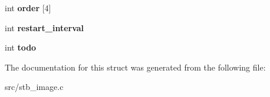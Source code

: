 \begin{DoxyCompactItemize}
\item 
\hypertarget{structjpeg_ac0f5240fc472e75239328f51a50f45b6}{}int {\bfseries order} \mbox{[}4\mbox{]}\label{structjpeg_ac0f5240fc472e75239328f51a50f45b6}

\item 
\hypertarget{structjpeg_ab13af34259b1f1c6cf8f35411a77e39e}{}int {\bfseries restart\+\_\+interval}\label{structjpeg_ab13af34259b1f1c6cf8f35411a77e39e}

\item 
\hypertarget{structjpeg_a6b4a8a352872847d84ea5ef1a4bc245e}{}int {\bfseries todo}\label{structjpeg_a6b4a8a352872847d84ea5ef1a4bc245e}

\end{DoxyCompactItemize}


The documentation for this struct was generated from the following file\+:\begin{DoxyCompactItemize}
\item 
src/stb\+\_\+image.\+c\end{DoxyCompactItemize}
